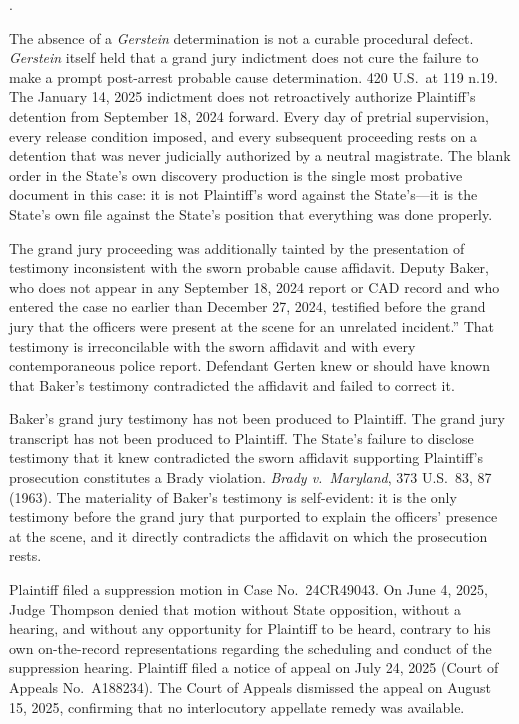 \documentclass[12pt,letterpaper]{article}
\newcounter{complaintpara}
\newenvironment{paras}{%
	\begin{list}{\arabic{complaintpara}.}{%
			\setlength{\leftmargin}{0.5in}%
			\setlength{\labelwidth}{0.4in}%
			\setlength{\labelsep}{0.1in}%
			\setlength{\itemsep}{0pt}%
			\setlength{\parsep}{0pt}%
			\setlength{\topsep}{6pt}%
		}%
	}{%
	\end{list}%
}
\begin{document}
\begin{paras}
		\item\label{fact:gerstein-downstream} The absence of a \textit{Gerstein} determination is not a curable procedural defect. \textit{Gerstein} itself held that a grand jury indictment does not cure the failure to make a prompt post-arrest probable cause determination. 420 U.S.\ at 119 n.19. The January 14, 2025 indictment does not retroactively authorize Plaintiff's detention from September 18, 2024 forward. Every day of pretrial supervision, every release condition imposed, and every subsequent proceeding rests on a detention that was never judicially authorized by a neutral magistrate. The blank order in the State's own discovery production is the single most probative document in this case: it is not Plaintiff's word against the State's---it is the State's own file against the State's position that everything was done properly.
		
		\item\label{fact:bakertestimony} The grand jury proceeding was
		additionally tainted by the presentation of testimony
		inconsistent with the sworn probable cause affidavit. Deputy
		Baker, who does not appear in any September 18, 2024 report or
		CAD record and who entered the case no earlier than
		December 27, 2024, testified before the grand jury that the
		officers were present at the scene for an unrelated
		incident.'' That testimony is irreconcilable with the sworn
		affidavit and with every contemporaneous police report.
		Defendant Gerten knew or should have known that Baker's
		testimony contradicted the affidavit and failed to correct it.
		
		\item\label{fact:gjbradywithheld} Baker's grand jury testimony
		has not been produced to Plaintiff. The grand jury transcript
		has not been produced to Plaintiff. The State's failure to
		disclose testimony that it knew contradicted the sworn
		affidavit supporting Plaintiff's prosecution constitutes a
		Brady violation. \textit{Brady v.\ Maryland}, 373 U.S.\ 83,
		87 (1963). The materiality of Baker's testimony is
		self-evident: it is the only testimony before the grand jury
		that purported to explain the officers' presence at the scene,
		and it directly contradicts the affidavit on which the
		prosecution rests.
		
		\item\label{fact:suppdenial} Plaintiff filed a suppression motion
		in Case No.\ 24CR49043. On June 4, 2025, Judge Thompson denied
		that motion without State opposition, without a hearing, and
		without any opportunity for Plaintiff to be heard, contrary to
		his own on-the-record representations regarding the scheduling
		and conduct of the suppression hearing. Plaintiff filed a
		notice of appeal on July 24, 2025 (Court of Appeals
		No.\ A188234). The Court of Appeals dismissed the appeal on
		August 15, 2025, confirming that no interlocutory appellate
		remedy was available.
		

\end{paras}
\end{document}
